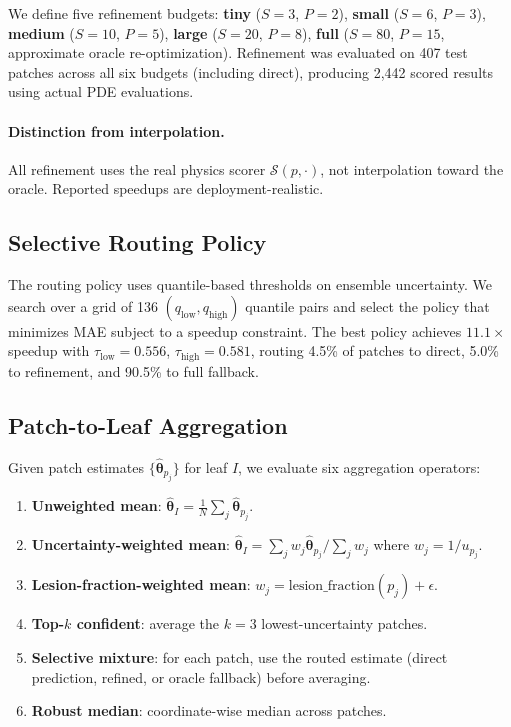 \documentclass[11pt,a4paper]{article}
\newcommand{\btheta}{\boldsymbol{\theta}}
\newcommand{\cS}{\mathcal{S}}
\begin{document}
We define five refinement budgets:
\textbf{tiny} ($S{=}3$, $P{=}2$),
\textbf{small} ($S{=}6$, $P{=}3$),
\textbf{medium} ($S{=}10$, $P{=}5$),
\textbf{large} ($S{=}20$, $P{=}8$),
\textbf{full} ($S{=}80$, $P{=}15$, approximate oracle re-optimization).
Refinement was evaluated on 407 test patches across all six budgets (including direct),
producing 2{,}442 scored results using actual PDE evaluations.

\paragraph{Distinction from interpolation.}
All refinement uses the real physics scorer $\cS(p, \cdot)$,
not interpolation toward the oracle. Reported speedups are deployment-realistic.

\subsection{Selective Routing Policy}
\label{sec:policy}

The routing policy uses quantile-based thresholds on ensemble uncertainty.
We search over a grid of 136 $(q_\text{low}, q_\text{high})$ quantile pairs
and select the policy that minimizes MAE subject to a speedup constraint.
The best policy achieves $11.1{\times}$ speedup with
$\tau_\text{low} = 0.556$, $\tau_\text{high} = 0.581$,
routing 4.5\% of patches to direct, 5.0\% to refinement, and
90.5\% to full fallback.

\subsection{Patch-to-Leaf Aggregation}
\label{sec:aggregation}

Given patch estimates $\{\hat{\btheta}_{p_j}\}$ for leaf $I$,
we evaluate six aggregation operators:

\begin{enumerate}[leftmargin=*,itemsep=2pt]
\item \textbf{Unweighted mean}: $\hat{\btheta}_I = \frac{1}{N}\sum_j \hat{\btheta}_{p_j}$.
\item \textbf{Uncertainty-weighted mean}:
  $\hat{\btheta}_I = \sum_j w_j \hat{\btheta}_{p_j} / \sum_j w_j$
  where $w_j = 1/u_{p_j}$.
\item \textbf{Lesion-fraction-weighted mean}:
  $w_j = \text{lesion\_fraction}(p_j) + \epsilon$.
\item \textbf{Top-$k$ confident}: average the $k{=}3$ lowest-uncertainty patches.
\item \textbf{Selective mixture}: for each patch, use the routed estimate
  (direct prediction, refined, or oracle fallback) before averaging.
\item \textbf{Robust median}: coordinate-wise median across patches.
\end{enumerate}
\end{document}

